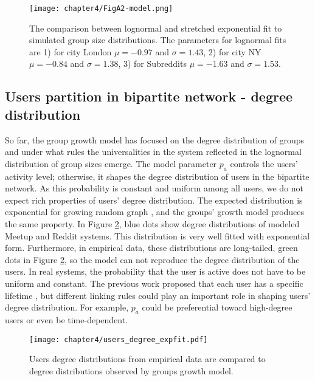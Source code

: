 \begin{figure}[H]
	\centering
	\texttt{[image: chapter4/FigA2-model.png]}
	\caption[The fitting of simulated group size distributions.]{The comparison between lognormal and stretched exponential fit to simulated group size distributions. The parameters for lognormal fits are 1) for city London $\mu=-0.97$ and $\sigma = 1.43$, 2) for city NY $\mu=-0.84$ and $\sigma = 1.38$, 3) for Subreddits $\mu=-1.63$ and $\sigma = 1.53$. }
	\label{fig:fit_model}
\end{figure}


\subsection{Users partition in bipartite network - degree distribution}

So far, the group growth model has focused on the degree distribution of groups and under what rules the universalities in the system reflected in the lognormal distribution of group sizes emerge. The model parameter $p_a$ controls the users' activity level; otherwise, it shapes the degree distribution of users in the bipartite network. As this probability is constant and uniform among all users, we do not expect rich properties of users' degree distribution. The expected distribution is exponential for growing random graph \cite{barabasi1999mean}, and the groups' growth model produces the same property. In Figure \ref{fig:users_degree}, blue dots show degree distributions of modeled Meetup and Reddit systems. This distribution is very well fitted with exponential form.
Furthermore, in empirical data, these distributions are long-tailed, green dots in Figure \ref{fig:users_degree}, so the model can not reproduce the degree distribution of the users. In real systems, the probability that the user is active does not have to be uniform and constant. The previous work proposed that each user has a specific lifetime \cite{leskovec2008microscopic}, but different linking rules could play an important role in shaping users' degree distribution. For example, $p_a$ could be preferential toward high-degree users or even be time-dependent.

\begin{figure}[h]
	\centering
	\texttt{[image: chapter4/users\_degree\_expfit.pdf]}
	\caption[Users degree distribution]{Users degree distributions from empirical data are compared to degree distributions observed by groups growth model.}
	\label{fig:users_degree}
\end{figure}

